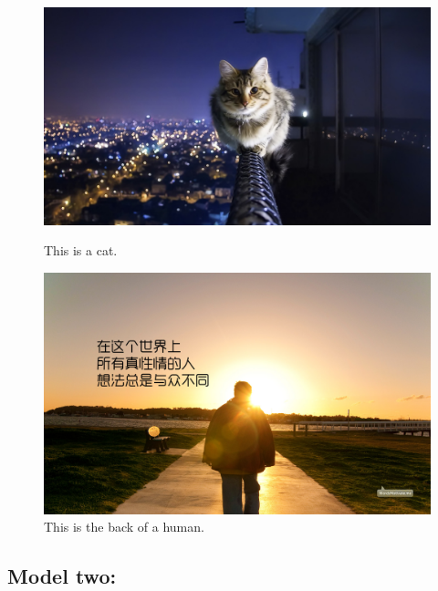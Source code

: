 \documentclass[a4paper,11pt]{article}
\begin{document}
\begin{figure}[!h]
  \centering %
  \begin{minipage}[t]{.49\linewidth}
  \includegraphics[width=1\textwidth]{./Pic/cat.JPG}
  \caption{This is a cat.}
  \end{minipage}
  \begin{minipage}[t]{.49\linewidth}
  \includegraphics[width=1\textwidth]{./Pic/human.jpg}
  \caption{This is the back of a human.}
  \end{minipage}
\end{figure}

\subsection{Model two:}
\end{document}
